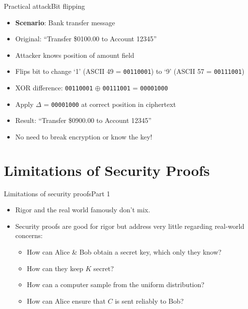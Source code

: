 \documentclass[aspectratio=169, lualatex, handout]{beamer}
\begin{document}
\begin{frame}{Practical attack}{Bit flipping}
	\begin{itemize}[<+->]
		\item \textbf{Scenario}: Bank transfer message
		\item Original: ``Transfer \$0100.00 to Account 12345''
		\item Attacker knows position of amount field
		\item Flips bit to change `1' (ASCII 49 = \texttt{00110001}) to `9' (ASCII 57 = \texttt{00111001})
		\item XOR difference: \texttt{00110001} $\oplus$ \texttt{00111001} = \texttt{00001000}
		\item Apply $\Delta$ = \texttt{00001000} at correct position in ciphertext
		\item Result: ``Transfer \$0900.00 to Account 12345''
		\item \alert{No need to break encryption or know the key!}
	\end{itemize}
\end{frame}

\section{Limitations of Security Proofs}

\begin{frame}{Limitations of security proofs}{Part 1}
	\begin{itemize}[<+->]
		\item Rigor and the real world famously don't mix.
		\item Security proofs are good for rigor but address very little regarding real-world concerns:
		      \begin{itemize}[<+->]
			      \item How can Alice \& Bob obtain a secret key, which only they know?
			      \item How can they keep $K$ secret?
			      \item How can a computer sample from the uniform distribution?
			      \item How can Alice ensure that $C$ is sent reliably to Bob?
		      \end{itemize}
	\end{itemize}
\end{frame}
\end{document}
